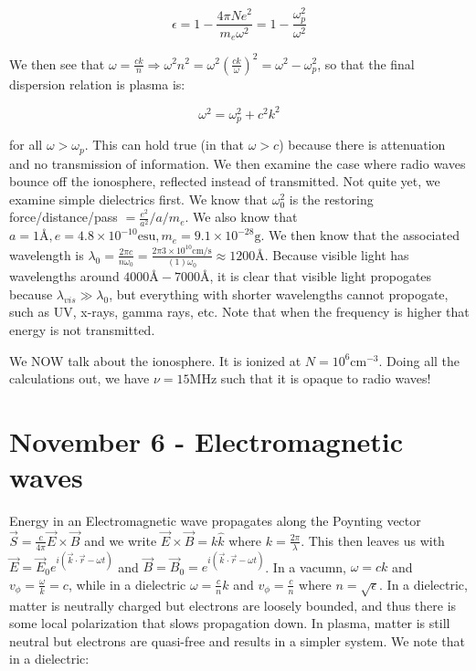 \documentclass{report}
\begin{document}
$$\epsilon = 1-\frac{4\pi Ne^2}{m_e\omega^2} = 1 - \frac{\omega_p^2}{\omega^2}$$

We then see that $\omega = \frac{ck}{n} \Rightarrow \omega^2n^2 = \omega^2(\frac{ck}{\omega})^2 = \omega^2 - \omega_p^2$, so that the final dispersion relation is plasma is:

$$\omega^2 = \omega_p^2 + c^2k^2$$

for all $\omega > \omega_p$. This can hold true (in that $\omega > c$) because there is attenuation and no transmission of information. We then examine the case where radio waves bounce off the ionosphere, reflected instead of transmitted. Not quite yet, we examine simple dielectrics first. We know that $\omega_0^2$ is the restoring force/distance/pass $= \frac{e^2}{a^2}/a/m_e$. We also know that $a = 1 \text{\AA}, e=4.8\times 10^{-10} \mathrm{esu}, m_e = 9.1 \times 10^{-28} \mathrm{g}$. We then know that the associated wavelength is $\lambda_0 = \frac{2\pi c}{n\omega_0} = \frac{2\pi 3\times 10^{10}\mathrm{cm/s}}{(1) \omega_0} \approx 1200\text{\AA}$. Because visible light has wavelengths around $4000\text{\AA}-7000\text{\AA}$, it is clear that visible light propogates because $\lambda_{vis} \gg \lambda_0$, but everything with shorter wavelengths cannot propogate, such as UV, x-rays, gamma rays, etc. Note that when the frequency is higher that energy is not transmitted.

We NOW talk about the ionosphere. It is ionized at $N=10^6 \mathrm{cm^{-3}}$. Doing all the calculations out, we have $\nu = 15 \mathrm{MHz}$ such that it is opaque to radio waves!

\chapter{November 6 - Electromagnetic waves}

Energy in an Electromagnetic wave propagates along the Poynting vector $\vec{S} = \frac{c}{4\pi}\vec{E}\times\vec{B}$ and we write $\vec{E}\times\vec{B} = k\hat{k}$ where $k = \frac{2\pi}{\lambda}$. This then leaves us with $\vec{E} = \vec{E}_0 e^{i(\vec{k}\cdot\vec{r} - \omega t)}$ and $\vec{B} = \vec{B}_0 = e^{i(\vec{k}\cdot\vec{r} - \omega t)}$. In a vacumn, $\omega = ck$ and $v_\phi = \frac{\omega}{k} = c$, while in a dielectric $\omega = \frac{c}{n}k$ and $v_\phi = \frac{c}{n}$ where $n = \sqrt{\epsilon}$. In a dielectric, matter is neutrally charged but electrons are loosely bounded, and thus there is some local polarization that slows propagation down. In plasma, matter is still neutral but electrons are quasi-free and results in a simpler system. We note that in a dielectric:
\end{document}
